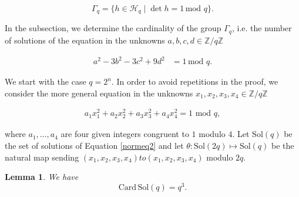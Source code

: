 \documentclass[10pt,a4paper]{amsart}
\newcommand{\Z}{\mathbb{Z}}
\newcommand{\Card}{\mathrm{Card\,}}
\newcommand{\Sol}{{\mathrm {Sol}}}
\renewcommand{\mod}{\,\mathrm{mod}\,}
\newtheorem{lemma}{Lemma}
\newcommand{\cH}{\mathcal{H}}
\begin{document}
$$\Gamma_q=\{h\in\cH_q\mid \det h=1\mod\,q\}.$$

\noindent In the subsection, we determine the cardinality of the group $\Gamma_q$, i.e. 
the number of solutions of the equation in the unknowns
$a, b, c, d\in \Z/q\Z$

\begin{align}
a^2-3b^2-3c^2+9d^2&=1 \mod\, q.\label{normeq}
\end{align}




We start with the  case $q=2^n$. In order to avoid
repetitions in the proof, we consider 
the more general equation in the unknowns
$x_1, x_2, x_3, x_4\in \Z/q\Z$

\begin{align}
a_1x_1^2+a_2x_2^2+a_3x_3^2+a_4x_4^2=1\,\mod\,q,\label{normeq2}
\end{align}


\noindent where $a_1,\ldots, a_4$ are four 
given integers congruent to $1$ modulo $4$.
Let $\Sol(q)$ be the set of solutions of Equation \ref{normeq2}
and let $\theta:\Sol(2q)\mapsto \Sol(q)$ be the natural map
sending $(x_1,x_2,x_3,x_4) to (x_1,x_2,x_3,x_4) \text{ modulo } 2q$.




\begin{lemma} \label{sol2} We have
$$\Card\Sol(q)=q^3.$$
\end{lemma}
\end{document}
